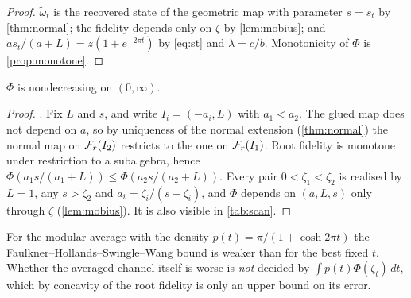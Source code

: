 \begin{proof}
$\widetilde\omega_t$ is the recovered state of the geometric map with parameter
$s=s_t$ by \cref{thm:normal}; the fidelity depends only on $\zeta$ by
\cref{lem:mobius}; and $as_t/(a+L)=z(1+e^{-2\pi t})$ by \eqref{eq:st} and
$\lambda=c/b$.  Monotonicity of $\Phi$ is \cref{prop:monotone}.
\end{proof}

\begin{proposition}[Monotonicity]\label{prop:monotone}
$\Phi$ is nondecreasing on $(0,\infty)$.
\end{proposition}

\begin{proof}
\cite[Prop.~8.1]{RigorCN5}.  Fix $L$ and $s$, and write $I_i=(-a_i,L)$ with $a_1<a_2$.  The glued map does not depend on $a$, so by uniqueness of the normal extension (\cref{thm:normal}) the normal map on $\mathcal F_r(I_2)$ restricts to the one on $\mathcal F_r(I_1)$.  Root fidelity is monotone under restriction to a subalgebra, hence $\Phi(a_1s/(a_1+L))\le\Phi(a_2s/(a_2+L))$.  Every pair $0<\zeta_1<\zeta_2$ is realised by $L=1$, any $s>\zeta_2$ and $a_i=\zeta_i/(s-\zeta_i)$, and $\Phi$ depends on $(a,L,s)$ only through $\zeta$ (\cref{lem:mobius}).  It is also
visible in \cref{tab:scan}.
\end{proof}

\begin{remark}\label{rem:twirled}
For the modular average with the density $p(t)=\pi/(1+\cosh2\pi t)$ the
Faulkner--Hollands--Swingle--Wang bound is weaker than for the best fixed $t$.
Whether the averaged channel itself is worse is \emph{not} decided by
$\int p(t)\Phi(\zeta_t)\,dt$, which by concavity of the root fidelity is only an
upper bound on its error.
\end{remark}
